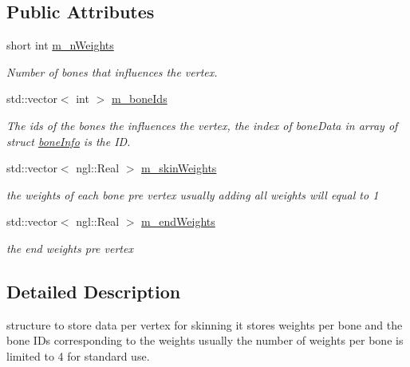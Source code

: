 \subsection*{Public Attributes}
\begin{DoxyCompactItemize}
\item 
short int \hyperlink{structvertex_bone_info_a0cf6fd740dc88b306d45207502aa0cbc}{m\-\_\-n\-Weights}
\begin{DoxyCompactList}\small\item\em Number of bones that influences the vertex. \end{DoxyCompactList}\item 
std\-::vector$<$ int $>$ \hyperlink{structvertex_bone_info_a1c6a7f3c896ef14cfd0d67413b4e6968}{m\-\_\-bone\-Ids}
\begin{DoxyCompactList}\small\item\em The ids of the bones the influences the vertex, the index of bone\-Data in array of struct \hyperlink{structbone_info}{bone\-Info} is the I\-D. \end{DoxyCompactList}\item 
std\-::vector$<$ ngl\-::\-Real $>$ \hyperlink{structvertex_bone_info_a3f832186c084ce895c7a98fc96bda4a0}{m\-\_\-skin\-Weights}
\begin{DoxyCompactList}\small\item\em the weights of each bone pre vertex usually adding all weights will equal to 1 \end{DoxyCompactList}\item 
std\-::vector$<$ ngl\-::\-Real $>$ \hyperlink{structvertex_bone_info_a2a6be4f7097e11c758236b20b7961bca}{m\-\_\-end\-Weights}
\begin{DoxyCompactList}\small\item\em the end weights pre vertex \end{DoxyCompactList}\end{DoxyCompactItemize}


\subsection{Detailed Description}
structure to store data per vertex for skinning it stores weights per bone and the bone I\-Ds corresponding to the weights usually the number of weights per bone is limited to 4 for standard use. 

